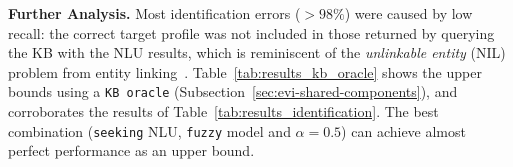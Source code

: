\documentclass[11pt]{article}
\newcommand{\rparagraph}[1]{\vspace{1.4mm}\noindent\textbf{#1.}}
\begin{document}
{\rparagraph{Further Analysis}
Most identification errors ($>98\%$) were caused by low recall:
the correct target profile was not included
in those returned by querying the KB with the NLU results, which is reminiscent of the \textit{unlinkable entity} (NIL) problem
from entity linking~\cite{ling2015design,hoffart2014discovering,mcnamee2009overview}.
Table~\ref{tab:results_kb_oracle} shows the upper bounds using a \texttt{KB oracle} (Subsection~\ref{sec:evi-shared-components}),
and corroborates the results of Table~\ref{tab:results_identification}.
The best combination (\texttt{seeking} NLU, \texttt{fuzzy} model and $\alpha=0.5$)
can achieve almost perfect performance as an upper bound.




\begin{table}[t]
\def\arraystretch{0.99}
\begin{center}
\end{center}
\end{table}}
\end{document}
